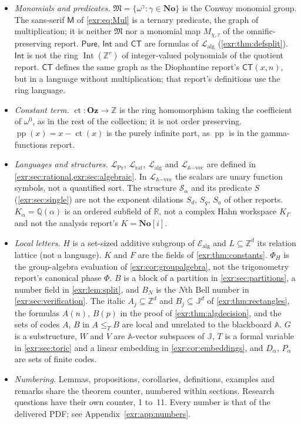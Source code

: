 \documentclass[11pt,letterpaper]{article}
\numberwithin{equation}{section}
\theoremstyle{definition}
\theoremstyle{remark}
\newcommand{\No}{\mathbf{No}}
\newcommand{\Oz}{\mathbf{Oz}}
\newcommand{\SC}{\mathbf{No}[i]}
\newcommand{\Z}{\mathbb Z}
\newcommand{\Q}{\mathbb Q}
\newcommand{\R}{\mathbb R}
\newcommand{\A}{\mathbb A}
\newcommand{\J}{\mathbb J}
\newcommand{\M}{\mathfrak M}
\newcommand{\Ealg}{\mathcal E_{\mathrm{alg}}}
\newcommand{\Lrat}{\mathcal L_{\mathrm{rat}}}
\newcommand{\Lalg}{\mathcal L_{\mathrm{alg}}}
\newcommand{\LPr}{\mathcal L_{\mathrm{Pr}}}
\newcommand{\Lvec}{\mathcal L_{\A\mathrm{-vec}}}
\newcommand{\ct}{\operatorname{ct}}
\newcommand{\pp}{\operatorname{pp}}
\newcommand{\Exp}{\operatorname{Exp}}
\newcommand{\Pure}{\mathsf{Pure}}
\newcommand{\Int}{\mathsf{Int}}
\newcommand{\ctgraph}{\mathsf{CT}}
\begin{document}
\begin{itemize}[leftmargin=*,itemsep=3pt]
\eqref{exr:eq:Expdef}: for $z=a+p$ the real part $\operatorname{Re}a+p$ is
exponentiated by $\exp$, and the imaginary part $\operatorname{Im}a$ is an
ordinary real number, where every phase is the ordinary one. So the two uses
of $\Exp$ never conflict. The tempting false reading is that the global map is
injective: its kernel is $2\pi i\,\Oz$, and $\Exp(ip)=1$ for every $p\in\J$
(\cref{exr:sec:collection}).
\item \emph{Monomials and predicates.} $\M=\{\omega^\gamma:\gamma\in\No\}$ is
the Conway monomial group. The sans-serif $\mathsf M$ of \eqref{exr:eq:Mul} is
a ternary predicate, the graph of multiplication; it is neither $\M$ nor a
monomial map $M_{\chi,\tau}$ of the omnific-preserving report. $\Pure$, $\Int$
and $\ctgraph$ are formulas of $\Lalg$ (\cref{exr:thm:defsplit}). $\Int$ is
not the ring $\operatorname{Int}(\Z^r)$ of integer-valued polynomials of the
quotient report. $\ctgraph$ defines the same graph as the Diophantine report's
$\mathsf{CT}(x,n)$, but in a language without multiplication; that report's
definitions use the ring language.
\item \emph{Constant term.} $\ct:\Oz\to\Z$ is the ring homomorphism taking the
coefficient of $\omega^0$, as in the rest of the collection; it is not order
preserving. $\pp(x)=x-\ct(x)$ is the purely infinite part, as $\pp$ is in the
gamma-functions report.
\item \emph{Languages and structures.} $\LPr$, $\Lrat$, $\Lalg$ and $\Lvec$
are defined in \cref{exr:sec:rational,exr:sec:algebraic}. In $\Lvec$ the
scalars are unary function symbols, not a quantified sort. The structure
$\mathcal S_\alpha$ and its predicate $S$ (\cref{exr:sec:single}) are not the
exponent dilations $S_d$, $S_q$, $S_a$ of other reports. $K_\alpha=\Q(\alpha)$
is an ordered subfield of $\R$, not a complex Hahn workspace $K_\Gamma$ and
not the analysis report's $K=\SC$.
\item \emph{Local letters.} $H$ is a set-sized additive subgroup of $\Ealg$
and $L\subseteq\Z^d$ its relation lattice (not a language). $K$ and $F$ are
the fields of \cref{exr:thm:constants}. $\Phi_H$ is the group-algebra
evaluation of \cref{exr:cor:groupalgebra}, not the trigonometry report's
canonical phase $\Phi$. $B$ is a block of a partition in
\cref{exr:sec:partitions}, a number field in \cref{exr:lem:split}, and
$B_N$ is the $N$th Bell number in \cref{exr:sec:verification}. The italic
$A_j\subseteq\Z^d$ and $B_j\subseteq\J^d$ of \cref{exr:thm:rectangles}, the
formulas $A(n)$, $B(p)$ in the proof of \cref{exr:thm:algdecision}, and the
sets of codes $A$, $B$ in $A\leq_TB$ are local and unrelated to the
blackboard $\A$. $G$ is a
substructure, $W$ and $V$ are $\A$-vector subspaces of $\J$, $T$ is a formal
variable in \cref{exr:sec:toric} and a linear embedding in
\cref{exr:cor:embeddings}, and $D_\alpha$, $P_\alpha$ are sets of finite codes.
\item \emph{Numbering.} Lemmas, propositions, corollaries, definitions,
examples and remarks share the theorem counter, numbered within sections.
Research questions have their own counter, 1 to~11. Every number is that of
the delivered PDF; see Appendix~\ref{exr:app:numbers}.
\end{itemize}
\end{document}
